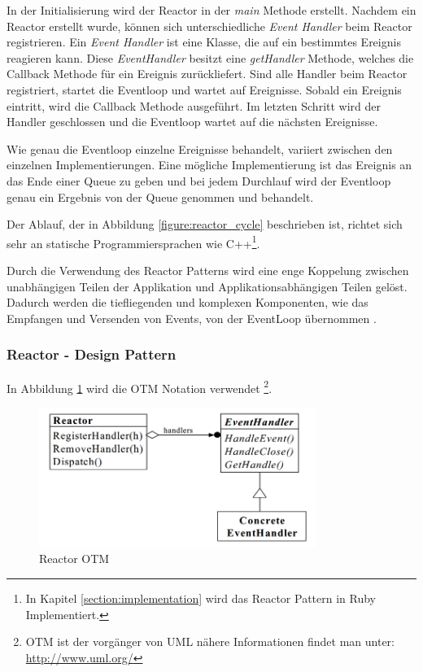 In der Initialisierung wird der Reactor in der \emph{main} Methode erstellt. Nachdem ein Reactor erstellt wurde, können sich unterschiedliche \emph{Event Handler} beim Reactor registrieren. Ein \emph{Event Handler} ist eine Klasse, die auf ein bestimmtes Ereignis reagieren kann. Diese \emph{EventHandler} besitzt eine \emph{getHandler} Methode, welches die Callback Methode für ein Ereignis zurückliefert. Sind alle Handler beim Reactor registriert, startet die Eventloop und wartet auf Ereignisse. Sobald ein Ereignis eintritt, wird die Callback Methode ausgeführt. Im letzten Schritt wird der Handler geschlossen und die Eventloop wartet auf die nächsten Ereignisse. 

Wie genau die Eventloop einzelne Ereignisse behandelt, variiert zwischen den einzelnen Implementierungen. Eine mögliche Implementierung ist das Ereignis an das Ende einer Queue zu geben und bei jedem Durchlauf wird der Eventloop genau ein Ergebnis von der Queue genommen und behandelt.

Der Ablauf, der in Abbildung \ref{figure:reactor_cycle} beschrieben ist, richtet sich sehr an statische Programmiersprachen wie C++\footnote{In Kapitel \ref{section:implementation} wird das Reactor Pattern in Ruby Implementiert.}.

Durch die Verwendung des Reactor Patterns wird eine enge Koppelung zwischen unabhängigen Teilen der Applikation und Applikationsabhängigen Teilen gelöst. Dadurch werden die tiefliegenden und komplexen Komponenten, wie das Empfangen und Versenden von Events, von der EventLoop übernommen \cite[p. 2]{Sch95}.

\subsubsection{Reactor - Design Pattern}

In Abbildung \ref{figure:reactor_otm} wird die OTM Notation verwendet \footnote[0]{OTM ist der vorgänger von UML nähere Informationen findet man unter: \url{http://www.uml.org/}}.

\begin{figure}[!htb]
  \centering
  \includegraphics[width=9cm]{images/reactor_otm.png}
  \caption{
    Reactor OTM \cite[p. 4]{Sch95}
  }
  \label{figure:reactor_otm}
\end{figure}


